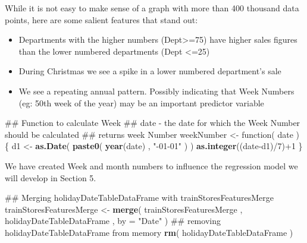\documentclass[]{article}
\newenvironment{Shaded}{\begin{snugshade}}{\end{snugshade}}
\newcommand{\KeywordTok}[1]{\textcolor[rgb]{0.13,0.29,0.53}{\textbf{{#1}}}}
\newcommand{\DataTypeTok}[1]{\textcolor[rgb]{0.13,0.29,0.53}{{#1}}}
\newcommand{\DecValTok}[1]{\textcolor[rgb]{0.00,0.00,0.81}{{#1}}}
\newcommand{\StringTok}[1]{\textcolor[rgb]{0.31,0.60,0.02}{{#1}}}
\newcommand{\NormalTok}[1]{{#1}}
\begin{document}
While it is not easy to make sense of a graph with more than 400
thousand data points, here are some salient features that stand out:

\begin{itemize}
\itemsep1pt\parskip0pt
\item
  Departments with the higher numbers (Dept\textgreater{}=75) have
  higher sales figures than the lower numbered departments (Dept
  \textless{}=25)
\item
  During Christmas we see a spike in a lower numbered department's sale
\item
  We see a repeating annual pattern. Possibly indicating that Week
  Numbers (eg: 50th week of the year) may be an important predictor
  variable
\end{itemize}

\begin{Shaded}
\begin{Highlighting}[]
\NormalTok{## Function to calculate Week}
\NormalTok{## date - the date for which the Week Number should be calculated}
\NormalTok{## returns week Number}
\NormalTok{weekNumber <-}\StringTok{ }\NormalTok{function( date ) \{}
  \NormalTok{d1 <-}\StringTok{ }\KeywordTok{as.Date}\NormalTok{( }\KeywordTok{paste0}\NormalTok{( }\KeywordTok{year}\NormalTok{(date) , }\StringTok{"-01-01"} \NormalTok{) )}
  \KeywordTok{as.integer}\NormalTok{((date-d1)/}\DecValTok{7}\NormalTok{)+}\DecValTok{1}
\NormalTok{\}}
\end{Highlighting}
\end{Shaded}

\begin{Shaded}
\end{Shaded}

We have created Week and month numbers to influence the regression model
we will develop in Section 5.

\begin{Shaded}
\begin{Highlighting}[]
\NormalTok{## Merging holidayDateTableDataFrame with trainStoresFeaturesMerge}
\NormalTok{trainStoresFeaturesMerge <-}\StringTok{ }
\StringTok{  }\KeywordTok{merge}\NormalTok{( trainStoresFeaturesMerge , holidayDateTableDataFrame , }\DataTypeTok{by =} \StringTok{"Date"} \NormalTok{)}
\NormalTok{## removing holidayDateTableDataFrame from memory}
\KeywordTok{rm}\NormalTok{( holidayDateTableDataFrame )}
\end{Highlighting}
\end{Shaded}
\end{document}
